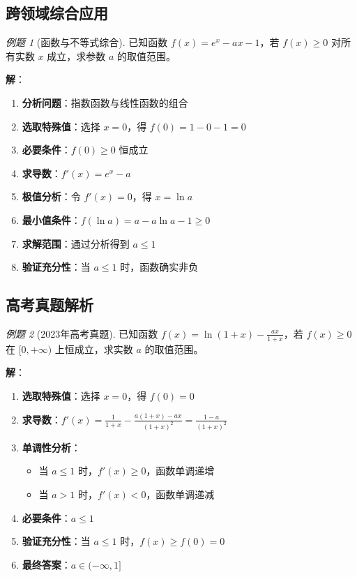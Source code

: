 \documentclass[a4paper,11pt]{ctexart}
\newcommand{\keypoint}[1]{\textcolor{secondary}{\textbf{#1}}}
\theoremstyle{definition}
\theoremstyle{remark}
\newtheorem{example}{例题}[section]
\begin{document}
\subsection{跨领域综合应用}

\begin{example}[函数与不等式综合]
已知函数 $f(x) = e^x - ax - 1$，若 $f(x) \geq 0$ 对所有实数 $x$ 成立，求参数 $a$ 的取值范围。

\textbf{解}：
\begin{enumerate}
    \item \keypoint{分析问题}：指数函数与线性函数的组合
    \item \keypoint{选取特殊值}：选择 $x = 0$，得 $f(0) = 1 - 0 - 1 = 0$
    \item \keypoint{必要条件}：$f(0) \geq 0$ 恒成立
    \item \keypoint{求导数}：$f'(x) = e^x - a$
    \item \keypoint{极值分析}：令 $f'(x) = 0$，得 $x = \ln a$
    \item \keypoint{最小值条件}：$f(\ln a) = a - a\ln a - 1 \geq 0$
    \item \keypoint{求解范围}：通过分析得到 $a \leq 1$
    \item \keypoint{验证充分性}：当 $a \leq 1$ 时，函数确实非负
\end{enumerate}
\end{example}

\subsection{高考真题解析}

\begin{example}[2023年高考真题]
已知函数 $f(x) = \ln(1+x) - \frac{ax}{1+x}$，若 $f(x) \geq 0$ 在 $[0,+\infty)$ 上恒成立，求实数 $a$ 的取值范围。

\textbf{解}：
\begin{enumerate}
    \item \keypoint{选取特殊值}：选择 $x = 0$，得 $f(0) = 0$
    \item \keypoint{求导数}：$f'(x) = \frac{1}{1+x} - \frac{a(1+x) - ax}{(1+x)^2} = \frac{1-a}{(1+x)^2}$
    \item \keypoint{单调性分析}：
    \begin{itemize}
        \item 当 $a \leq 1$ 时，$f'(x) \geq 0$，函数单调递增
        \item 当 $a > 1$ 时，$f'(x) < 0$，函数单调递减
    \end{itemize}
    \item \keypoint{必要条件}：$a \leq 1$
    \item \keypoint{验证充分性}：当 $a \leq 1$ 时，$f(x) \geq f(0) = 0$
    \item \keypoint{最终答案}：$a \in (-\infty, 1]$
\end{enumerate}
\end{example}
\end{document}
